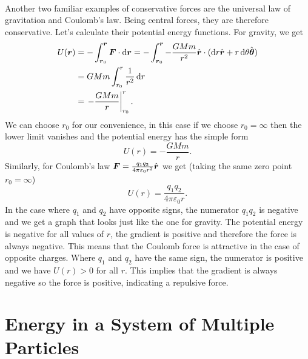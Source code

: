 \documentclass[../classical_mechanics.tex]{subfiles}
\begin{document}
        \paragraph{}
        Another two familiar examples of conservative forces are the universal law of gravitation and Coulomb's law.
        Being central forces, they are therefore conservative.
        Let's calculate their potential energy functions.
        For gravity, we get
        \begin{align}
            U(\vec{r})&=-\int_{\vec{r}_0}^{\vec{r}}\vec{F}\cdot\dd{\vec{r}}=-\int_{\vec{r}_0}^{\vec{r}}-\frac{GMm}{r^2}\uvec{r}\cdot(\dd{r}\uvec{r}+r\dd{\theta}\uvec{\theta})\\
            &=GMm\int_{r_0}^{r}\frac{1}{r^2}\dd{r}\\
            &=\left.-\frac{GMm}{r}\right|_{r_0}^{r}.
        \end{align}
        We can choose $r_0$ for our convenience, in this case if we choose $r_0=\infty$ then the lower limit vanishes and the potential energy has the simple form
        \begin{equation}
            U(r)=-\frac{GMm}{r}.
        \end{equation}
        Similarly, for Coulomb's law $\boldsymbol{F}=\frac{q_1q_2}{4\pi\varepsilon_0r^2}\hat{\boldsymbol{r}}$ we get (taking the same zero point $r_0=\infty$)
        \begin{equation}
            U(r)=\frac{q_1q_2}{4\pi\varepsilon_0r}.
        \end{equation}
        In the case where $q_1$ and $q_2$ have opposite signs, the numerator $q_1q_2$ is negative and we get a graph that looks just like the one for gravity.
        The potential energy is negative for all values of $r$, the gradient is positive and therefore the force is always negative.
        This means that the Coulomb force is attractive in the case of opposite charges.
        Where $q_1$ and $q_2$ have the same sign, the numerator is positive and we have $U(r)>0$ for all $r$.
        This implies that the gradient is always negative so the force is positive, indicating a repulsive force.

    \section{Energy in a System of Multiple Particles}
\end{document}
